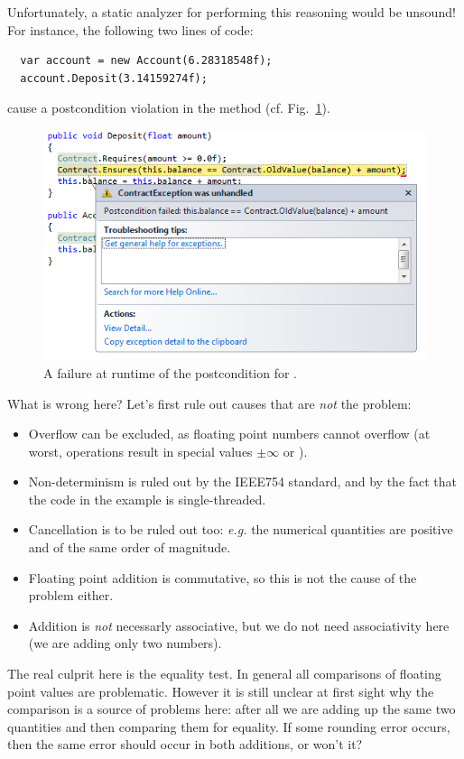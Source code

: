 \documentclass{entcs}
\begin{document}
\noindent
Unfortunately, a static analyzer for  performing this reasoning would be unsound! 
For instance, the following two lines of  code:
\begin{lstlisting}
  var account = new Account(6.28318548f);
  account.Deposit(3.14159274f);
\end{lstlisting}
cause a postcondition violation in the method 
(cf. Fig.~\ref{fig:failure}).

\begin{figure}[t]
  \includegraphics[width=\textwidth]{PostConditionFailed.png}
\caption{A failure at runtime of the postcondition for .}
\label{fig:failure}
\end{figure}

\noindent
What is wrong here? Let's first rule out causes that are \emph{not}
the problem:
\begin{itemize}
\item Overflow can be excluded, as floating point numbers
cannot overflow (at worst, operations result in special values $\pm \infty$ or ).

\item Non-determinism  is ruled out by the IEEE754 standard, and by the fact that the code in the example is single-threaded. 

\item Cancellation is to be ruled out too: \emph{e.g.} the numerical quantities are positive and of the same order of magnitude.

\item Floating point addition is commutative, so this is not the cause of the problem either. 

\item Addition is \emph{not} necessarly associative, but we do not need associativity here (we are adding only two numbers).
\end{itemize}
The real culprit here is the equality test. In general all comparisons of floating point values are problematic. 
However it is still unclear at first sight why the comparison is a
source of problems here: after all we are adding up the same two quantities and then comparing them for equality.
If some  rounding error occurs, then the same error should occur
in both additions, or won't it?
\end{document}
